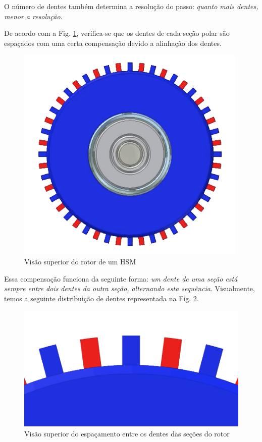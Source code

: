 	O número de dentes também determina a resolução do passo: \emph{quanto mais dentes, menor a resolução}.
	
	De acordo com a Fig. \ref{rotor3}, verifica-se que os dentes de cada seção polar são espaçados com uma certa compensação devido a alinhação dos dentes. 
	
	\begin{figure}[!h]
		\centering 
		\includegraphics[scale=0.3]{images/hsm_operation/rotormag3}
		\caption{Visão superior do rotor de um HSM}
		\label{rotor3}
	\end{figure}
	
	Essa compensação funciona da seguinte forma: \emph{um dente de uma seção está sempre entre dois dentes da outra seção, alternando esta sequência}. Visualmente, temos a seguinte distribuição de dentes representada na Fig. \ref{rotor4}.
	
	\begin{figure}[!h]
		\centering 
		\includegraphics[scale=0.2]{images/hsm_operation/rotormag4}
		\caption{Visão superior do espaçamento entre os dentes das seções do rotor}
		\label{rotor4}
	\end{figure}
	
